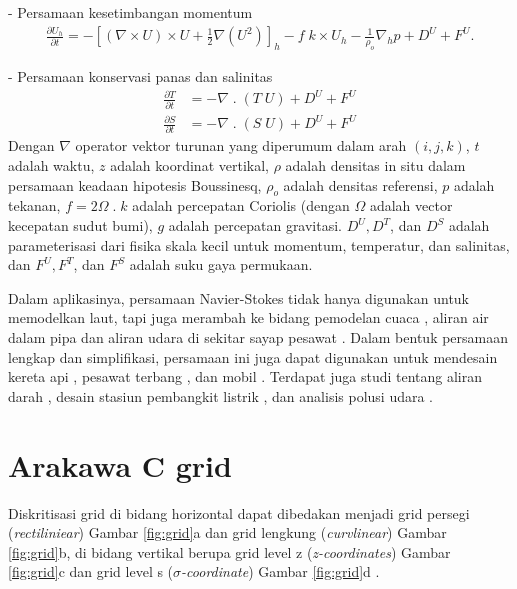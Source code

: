 \begin{spacing}{1.5}
	- Persamaan kesetimbangan momentum
	\begin{equation}\label{eq:P2}
		\begin{aligned}
			\frac{\partial U_h}{\partial t} = - \left[(\nabla \times U) \times U + \frac{1}{2}\nabla (U^2)\right]_h - f \; k \times U_h - \frac{1}{\rho_o}\nabla_h p + D^U + F^U.
		\end{aligned}
	\end{equation}

	- Persamaan konservasi panas dan salinitas
	\begin{equation}\label{eq:P3}
		\begin{aligned}
			\frac{\partial T}{\partial t} &= - \nabla \; . \; (T\;U)  + D^U + F^U \\
			\frac{\partial S}{\partial t} &= - \nabla \; . \; (S\;U)  + D^U + F^U
		\end{aligned}
	\end{equation}
	Dengan $\nabla$ operator vektor turunan yang diperumum dalam arah $(i,j,k)$, $t$ adalah waktu, $z$ adalah koordinat vertikal, $\rho$ adalah densitas in situ dalam persamaan keadaan hipotesis Boussinesq, $\rho_o$ adalah densitas referensi, $p$ adalah tekanan, $f = 2\Omega\; . \;k$ adalah percepatan Coriolis (dengan $\Omega$ adalah vector kecepatan sudut bumi), $g$ adalah percepatan gravitasi. $D^U, D^T$, dan $D^S$ adalah parameterisasi dari fisika skala kecil  untuk momentum, temperatur, dan salinitas, dan $F^U,F^T$, dan $F^S$ adalah suku gaya permukaan.
	 
	Dalam aplikasinya, persamaan Navier-Stokes tidak hanya digunakan untuk memodelkan laut, tapi juga merambah ke bidang pemodelan cuaca , aliran air dalam pipa  dan aliran udara di sekitar sayap pesawat . Dalam bentuk persamaan lengkap dan simplifikasi, persamaan ini juga dapat digunakan untuk mendesain kereta api , pesawat terbang , dan mobil . Terdapat juga studi tentang aliran darah , desain stasiun pembangkit listrik , dan analisis polusi udara . 

\section[Arakawa C grid]{Arakawa C grid}
	Diskritisasi grid di bidang horizontal dapat dibedakan menjadi grid persegi (\textit{rectiliniear}) Gambar \ref{fig:grid}a dan grid lengkung (\textit{curvlinear}) Gambar \ref{fig:grid}b, di bidang vertikal berupa grid level z (\textit{z-coordinates}) Gambar \ref{fig:grid}c dan grid level s (\textit{$\sigma$-coordinate}) Gambar \ref{fig:grid}d .
	

\end{spacing}
